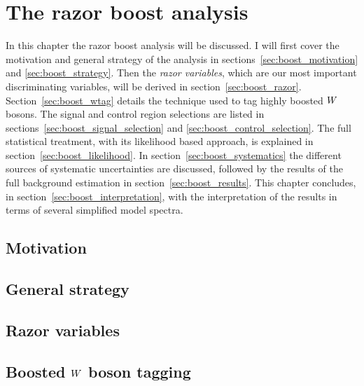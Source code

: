 \chapter{The razor boost analysis \label{chap:razorboost}}

In this chapter the razor boost analysis will be discussed. 
I will first cover the motivation and general strategy of the analysis in sections~\ref{sec:boost_motivation} and \ref{sec:boost_strategy}. 
Then the \textit{razor variables}, which are our most important discriminating variables, will be derived in section~\ref{sec:boost_razor}.
Section~\ref{sec:boost_wtag} details the technique used to tag highly boosted $W$ bosons. 
The signal and control region selections are listed in sections~\ref{sec:boost_signal_selection} and \ref{sec:boost_control_selection}. 
The full statistical treatment, with its likelihood based approach, is explained in section~\ref{sec:boost_likelihood}. 
In section~\ref{sec:boost_systematics} the different sources of systematic uncertainties are discussed, followed by the results of the full
background estimation in section~\ref{sec:boost_results}. 
This chapter concludes, in section~\ref{sec:boost_interpretation}, with the interpretation of the results in terms of several simplified model spectra. 

\section{Motivation \label{sec:boost_motivation}}


\section{General strategy \label{sec:boost_strategy}}


\section{Razor variables \label{sec:boost_razor}}



\section[Boosted W boson tagging]{Boosted $W$ boson tagging \label{sec:boost_wtag}}

